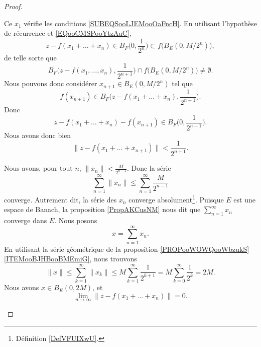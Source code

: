 \begin{proof}
\begin{subproof}
\begin{subproof}
			Ce \( x_1\) vérifie les conditions \eqref{SUBEQSooLJEMooOaFncH}.
			\spitem[La récurrence]
			En utilisant l'hypothèse de récurrence et \eqref{EQooCMSPooYtzAuC},
			\begin{equation}
				z-f(x_1+\ldots +x_n)\in B_F\big( 0,\frac{1}{ 2^n } \big)\subset\overline{ f\big( B_E(0,M/2^n) \big) },
			\end{equation}
			de telle sorte que
			\begin{equation}
				B_F\big( z-f(x_1,\ldots, x_n),\frac{1}{ 2^{n+1} } \big)\cap f\big( B_E(0,M/2^n) \big)\neq \emptyset.
			\end{equation}
			Nous pouvons donc considérer \( x_{n+1}\in B_E(0,M/2^n)\) tel que
			\begin{equation}
				f(x_{n+1})\in B_F\big( z-f(x_1+\ldots +x_n),\frac{1}{ 2^{n+1} } \big).
			\end{equation}
			Donc
			\begin{equation}
				z-f(x_1+\ldots +x_n)-f(x_{n+1})\in B_F\big( 0,\frac{1}{ 2^{n+1} } \big).
			\end{equation}
			Nous avons donc bien
			\begin{equation}
				\| z-f(x_1+\ldots +x_{n+1}) \|<\frac{1}{ 2^{n+1} }.
			\end{equation}
		\end{subproof}
		\spitem[Convergence]
		Nous avons, pour tout \( n\), \( \| x_n \|<\frac{ M }{ 2^{n-1} }\). Donc la série
		\begin{equation}
			\sum_{n=1}^{\infty}\| x_n \|\leq \sum_{n=1}^{\infty}\frac{ M }{ 2^{n-1} }
		\end{equation}
		converge. Autrement dit, la série des \( x_n\) converge absolument\footnote{Définition \ref{DefVFUIXwU}.}. Puisque \( E\) est une espace de Banach, la proposition \ref{PropAKCusNM} nous dit que \( \sum_{n=1}^{\infty}x_n\) converge dans \( E\). Nous posons
		\begin{equation}
			x=\sum_{n=1}^{\infty}x_n.
		\end{equation}
		En utilisant la série géométrique de la proposition \ref{PROPooWOWQooWbzukS}\ref{ITEMooBJHBooBMEmiG}, nous trouvons
		\begin{equation}
			\| x \|\leq \sum_{k=1}^{\infty}\| x_k \|\leq M\sum_{k=1}^{\infty}\frac{1}{ 2^{k+1} }=M\sum_{k=0}^{\infty}\frac{1}{ 2^k }=2M.
		\end{equation}
		Nous avons \( x\in B_E(0,2M)\), et
		\begin{equation}
			\lim_{n\to \infty} \| z-f(x_1+\ldots +x_n) \|=0.
		\end{equation}

\end{subproof}
\end{proof}
